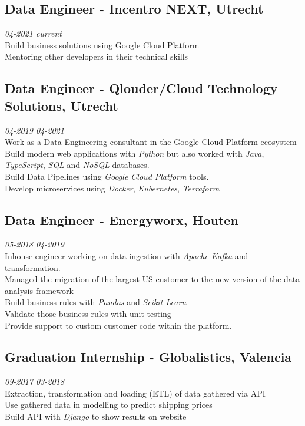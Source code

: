\documentclass{article}
\begin{document}
\subsection{Data Engineer - Incentro NEXT, Utrecht} \hfill {\em 04-2021 current} \\
Build business solutions using Google Cloud Platform \\
Mentoring other developers in their technical skills \\


\subsection{Data Engineer - Qlouder/Cloud Technology Solutions, Utrecht} \hfill {\em 04-2019 04-2021} \\
Work as a Data Engineering consultant in the Google Cloud Platform ecosystem \\
Build modern web applications with \emph{Python} but also worked with \emph{Java}, \emph{TypeScript}, \emph{SQL} and \emph{NoSQL} databases. \\
Build Data Pipelines using \emph{Google Cloud Platform} tools. \\
Develop microservices using \emph{Docker}, \emph{Kubernetes}, \emph{Terraform} \\

\subsection{Data Engineer - Energyworx, Houten} \hfill {\em 05-2018 04-2019} \\
Inhouse engineer working on data ingestion with \emph{Apache Kafka} and transformation. \\
Managed the migration of the largest US customer to the new version of the data analysis framework \\
Build business rules with \emph{Pandas} and \emph{Scikit Learn} \\
Validate those business rules with unit testing \\
Provide support to custom customer code within the platform. \\

\subsection{Graduation Internship - Globalistics, Valencia} \hfill {\em 09-2017 03-2018} \\
Extraction, transformation and loading (ETL) of data gathered via API \\
Use gathered data in modelling to predict shipping prices \\
Build API with \emph{Django} to show results on website \\
\end{document}
